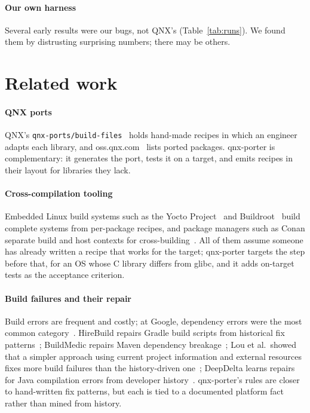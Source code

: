 \documentclass[conference]{IEEEtran}
\begin{document}
\paragraph{Our own harness} Several early results were our bugs, not QNX's (Table~\ref{tab:runs}). We found
them by distrusting surprising numbers; there may be others.

\section{Related work}\label{sec:related}

\paragraph{QNX ports} QNX's \texttt{qnx-ports/build-files}~\cite{qnxports} holds hand-made recipes in which an
engineer adapts each library, and oss.qnx.com~\cite{ossqnx} lists ported packages. qnx-porter is complementary:
it generates the port, tests it on a target, and emits recipes in their layout for libraries they lack.

\paragraph{Cross-compilation tooling} Embedded Linux build systems such as the Yocto Project~\cite{yocto} and
Buildroot~\cite{buildroot} build complete systems from per-package recipes, and package managers such as Conan
separate build and host contexts for cross-building~\cite{conan}. All of them assume someone has already written
a recipe that works for the target; qnx-porter targets the step before that, for an OS whose C library differs
from glibc, and it adds on-target tests as the acceptance criterion.

\paragraph{Build failures and their repair} Build errors are frequent and costly; at Google, dependency errors
were the most common category~\cite{seo2014}. HireBuild repairs Gradle build scripts from historical fix
patterns~\cite{hassan2018}; BuildMedic repairs Maven dependency breakage~\cite{macho2018}; Lou et al.\ showed that
a simpler approach using current project information and external resources fixes more build failures than the
history-driven one~\cite{lou2019}; DeepDelta learns repairs for Java compilation errors from developer
history~\cite{mesbah2019}. qnx-porter's rules are closer to hand-written fix patterns, but each is tied to a
documented platform fact rather than mined from history.
\end{document}

